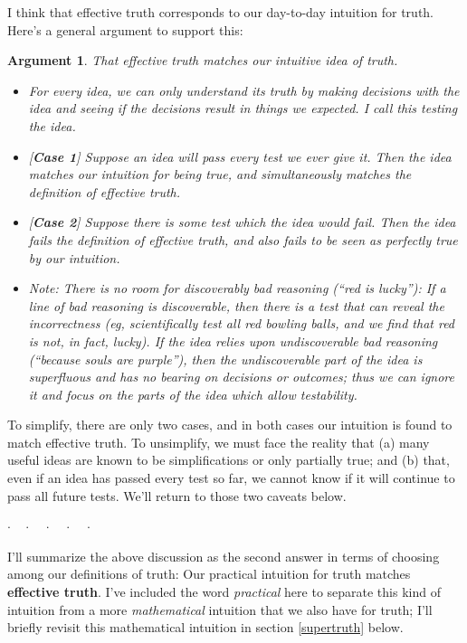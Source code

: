 \documentclass[11pt, oneside]{article}
\newenvironment{answerwnum}[1]
  {\renewcommand\theinnercustomthm{#1}\innercustomthm}
  {\endinnercustomthm}
\theoremstyle{argtstyle}
\newtheorem*{argt}{Argument}
\newcommand{\dotq}{\cdot\quad}
\newcommand{\scenebreak}{
    \medskip\centerline{$\dotq\dotq\dotq\dotq\cdot$}\medskip
}
\begin{document}
I think that effective truth corresponds to our day-to-day intuition for truth.
Here's a general argument to support this:
\begin{argt} That effective truth matches our intuitive idea of truth.
    \normalfont
\begin{itemize}
    \item For every idea, we can only understand its truth by making decisions
        with the idea and seeing if the decisions result in things we expected.
        I call this {\em testing the idea.}
    \item{} [{\bf Case 1}]
        Suppose an idea will pass every test we ever give it. Then
        the idea
        matches our intuition for being true, and simultaneously matches the
        definition of effective truth.
    \item{} [{\bf Case 2}]
        Suppose there is some test which the idea would fail.
        Then the idea fails the definition of
        effective truth, and also fails to be seen as perfectly true by our
        intuition.
    \item{}
        {\em Note:} There is no room for discoverably
        bad reasoning (``red is lucky''):
        If a line of bad reasoning is discoverable,
        then there is a test that can reveal the incorrectness
        (eg, scientifically test all red bowling balls, and we find that red is
        not, in fact, lucky).
        If the idea
        relies upon undiscoverable bad reasoning (``because souls are purple''),
        then the undiscoverable part of the idea is superfluous and has no
        bearing on decisions or outcomes; thus we can ignore it and focus on the
        parts of the idea which allow testability.
\end{itemize}
\end{argt}
To simplify, there are only two cases, and in both cases our intuition is
found to match effective truth. To unsimplify, we must face the reality that (a)
many useful ideas are known to be simplifications or only partially true; and
(b) that, even if an idea has passed every test so far, we cannot know if it
will continue to pass all future tests.
We'll return to those two caveats below.

\scenebreak

I'll summarize the above discussion as the second answer in terms
of choosing among our definitions of truth:
\begin{answerwnum}{B}
    Our practical intuition for truth matches
    \textbf{effective truth}.
\end{answerwnum}
I've included the word {\em practical} here to separate this kind of intuition
from a more {\em mathematical} intuition that we also have for truth;
I'll briefly revisit this mathematical intuition in section \ref{supertruth}
below.
\end{document}
